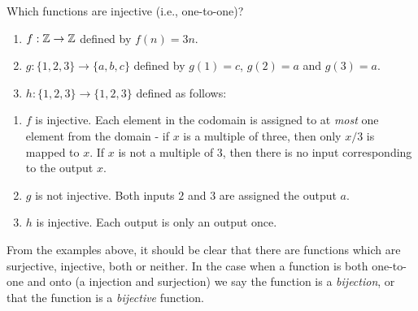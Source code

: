 \documentclass[12pt]{article}
\begin{document}
\begin{example}
  Which functions are injective (i.e., one-to-one)?
    \begin{enumerate}
    \item $f:\mathbb Z \to \mathbb Z$ defined by $f(n) = 3n$.  
    \item $g: \{1,2,3\} \to \{a,b,c\}$ defined by $g(1) = c$, $g(2) = a$ and $g(3) = a$.  
    \item $h:\{1,2,3\} \to \{1,2,3\}$ defined as follows:
    \begin{center}
    \end{center}
  \end{enumerate}
  \begin{solution}
    \begin{enumerate}
      \item $f$ is injective.  Each element in the codomain is assigned to at {\em most} one element from the domain - if $x$ is a multiple of three, then only $x/3$ is mapped to $x$.  If $x$ is not a multiple of 3, then there is no input corresponding to the output $x$.
      \item $g$ is not injective.  Both inputs $2$ and $3$ are assigned the output $a$.
      \item $h$ is injective.  Each output is only an output once.
    \end{enumerate}

  \end{solution}

\end{example}



From the examples above, it should be clear that there are functions which are surjective, injective, both or neither.  In the case when a function is both one-to-one and onto (a injection and surjection) we say the function is a {\em bijection}, or that the function is a {\em bijective} function.  
\end{document}
